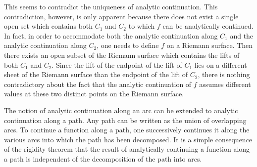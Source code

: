 \documentclass[12pt]{article}
\begin{document}
This seems to contradict the uniqueness of analytic continuation.  This contradiction, however, is only apparent because there does not exist a single open set which contains both $C_1$ and $C_2$ to which $f$ can be analytically continued.  In fact, in order to accommodate both the analytic continuation along $C_1$ and the analytic continuation along $C_2$, one needs to define $f$ on a Riemann surface.  Then there exists an open subset of the Riemann surface which contains the lifts of both $C_1$ and $C_2$.  Since the lift of the endpoint of the lift of $C_1$ lies on a different sheet of the Riemann surface than the endpoint of the lift of $C_2$, there is nothing contradictory about the fact that the analytic continuation of $f$ assumes different values at these two distinct points on the Riemann surface.

The notion of analytic continuation along an arc can be extended to analytic continuation along a path.  Any path can be written as the union of overlapping arcs.  To continue a function along a path, one successively continues it along the various arcs into which the path has been decomposed.  It is a simple consequence of the rigidity theorem that the result of analytically continuing a function along a path is independent of the decomposition of the path into arcs.
\end{document}
